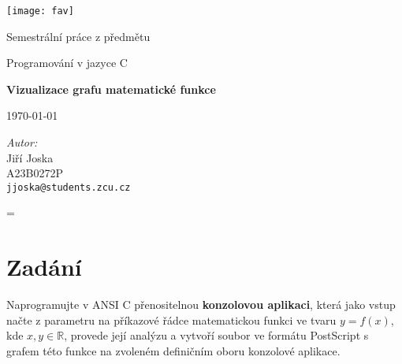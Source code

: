 \documentclass[12pt]{article} %
\newenvironment{absolutelynopagebreak}
  {\par\nobreak\vfil\penalty0\vfilneg
   \vtop\bgroup}
  {\par\xdef\tpd{\the\prevdepth}\egroup
   \prevdepth=\tpd}
\newcommand{\lawyertalk}{\tiny}
\begin{document}
\begin{titlepage}
    \centering      %
    \Large          %
    \sffamily       %

    \texttt{[image: fav]}

    Semestrální práce z předmětu

    Programování v jazyce C
    
    \vspace{18mm}
    {\Huge\bfseries Vizualizace grafu matematické funkce}

    \vspace{18mm}
    \today                          %

    \vfill                          %
    \raggedright                    %
    \textsl{\lawyertalk Autor:}\\   %
    Jiří Joska\\               %
    A23B0272P\\
    \texttt{jjoska@students.zcu.cz}

\end{titlepage}

\begin{absolutelynopagebreak}
\vspace*{-1.5cm}
\tableofcontents
\end{absolutelynopagebreak}
\vspace*{1.5cm}
\pagebreak
\section{Zadání} %
Naprogramujte v ANSI C přenositelnou \textbf{konzolovou aplikaci}, která jako vstup načte z parametru na příkazové řádce matematickou funkci ve tvaru $y = f(x)$, kde $x,y \in \mathbb{R}$, provede její analýzu a vytvoří soubor ve formátu PostScript s grafem této funkce na zvoleném definičním oboru konzolové aplikace.
\end{document}
